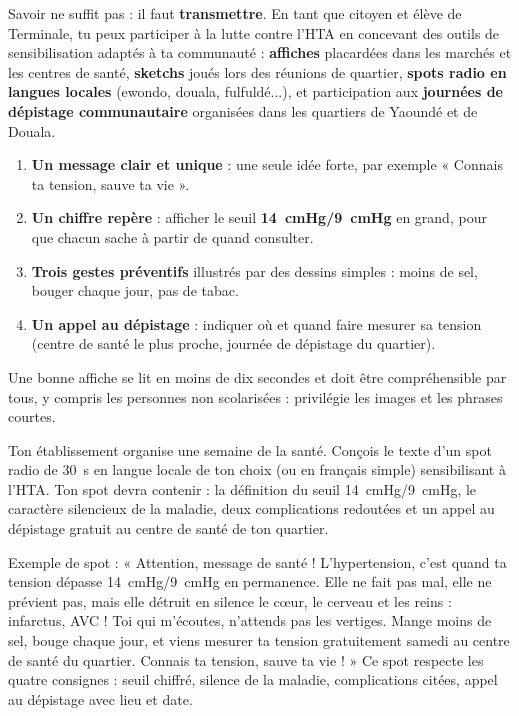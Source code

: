 \documentclass[11pt]{article}
\newcounter{popsec}
\newcounter{popsub}
\newcommand{\courssub}[1]{%
  \stepcounter{popsub}%
  \par\vspace{9pt}\noindent{\popxbold\fontsize{11.5}{13}\selectfont\color{popink}{\color{poporange}\thepopsec.\thepopsub}\hspace{6pt}#1}\par\nopagebreak\vspace{4pt}
}
\begin{document}
\courssub{Élaborer des outils de sensibilisation}

Savoir ne suffit pas : il faut \textbf{transmettre}. En tant que citoyen et élève de Terminale, tu peux participer à la lutte contre l'HTA en concevant des outils de sensibilisation adaptés à ta communauté : \textbf{affiches} placardées dans les marchés et les centres de santé, \textbf{sketchs} joués lors des réunions de quartier, \textbf{spots radio en langues locales} (ewondo, douala, fulfuldé...), et participation aux \textbf{journées de dépistage communautaire} organisées dans les quartiers de Yaoundé et de Douala.

\begin{methode}
\begin{enumerate}
\item \textbf{Un message clair et unique} : une seule idée forte, par exemple « Connais ta tension, sauve ta vie ».
\item \textbf{Un chiffre repère} : afficher le seuil \textbf{\SI{14}{cmHg}/\SI{9}{cmHg}} en grand, pour que chacun sache à partir de quand consulter.
\item \textbf{Trois gestes préventifs} illustrés par des dessins simples : moins de sel, bouger chaque jour, pas de tabac.
\item \textbf{Un appel au dépistage} : indiquer où et quand faire mesurer sa tension (centre de santé le plus proche, journée de dépistage du quartier).
\end{enumerate}
Une bonne affiche se lit en moins de dix secondes et doit être compréhensible par tous, y compris les personnes non scolarisées : privilégie les images et les phrases courtes.
\end{methode}

\begin{exercice}
Ton établissement organise une semaine de la santé. Conçois le texte d'un spot radio de \SI{30}{s} en langue locale de ton choix (ou en français simple) sensibilisant à l'HTA. Ton spot devra contenir : la définition du seuil \SI{14}{cmHg}/\SI{9}{cmHg}, le caractère silencieux de la maladie, deux complications redoutées et un appel au dépistage gratuit au centre de santé de ton quartier.
\end{exercice}

\begin{corrige}[Exercice]
Exemple de spot : « Attention, message de santé ! L'hypertension, c'est quand ta tension dépasse \SI{14}{cmHg}/\SI{9}{cmHg} en permanence. Elle ne fait pas mal, elle ne prévient pas, mais elle détruit en silence le c\oe ur, le cerveau et les reins : infarctus, AVC ! Toi qui m'écoutes, n'attends pas les vertiges. Mange moins de sel, bouge chaque jour, et viens mesurer ta tension gratuitement samedi au centre de santé du quartier. Connais ta tension, sauve ta vie ! » Ce spot respecte les quatre consignes : seuil chiffré, silence de la maladie, complications citées, appel au dépistage avec lieu et date.
\end{corrige}
\end{document}
